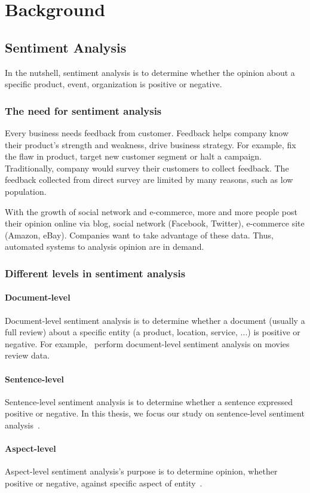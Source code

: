 \hypertarget{chap:background}{\chapter{Background}}\label{chap:background}
\section{Sentiment Analysis}
In the nutshell, sentiment analysis is to determine whether the opinion about a specific product, event, organization is positive or negative.
\subsection{The need for sentiment analysis}
Every business needs feedback from customer. Feedback helps company know their product's strength and weakness, drive business strategy.
For example, fix the flaw in product, target new customer segment or halt a campaign. 
Traditionally, company would survey their customers to collect feedback.  
The feedback collected from direct survey are limited by many reasons, such as low population.

With the growth of social network and e-commerce, more and more people post their opinion online via blog, social network (Facebook, Twitter), e-commerce site (Amazon, eBay). Companies want to take advantage of these data. Thus, automated systems to analysis opinion are in demand.
\subsection{Different levels in sentiment analysis}
\subsubsection{Document-level}
Document-level sentiment analysis is to determine whether a document (usually a full review) about a specific entity (a product, location, service, ...) is positive or negative. For example,~\cite{pang2002thumbs} perform document-level sentiment analysis on movies review data.
\subsubsection{Sentence-level}\label{sec:sent-level}
Sentence-level sentiment analysis is to determine whether a sentence expressed positive or negative. 
In this thesis, we focus our study on sentence-level sentiment analysis~\cite{liu2012sentiment}.
\subsubsection{Aspect-level}
Aspect-level  sentiment analysis's purpose is to determine opinion, whether positive or negative, against specific aspect of entity~\cite{liu2012sentiment}.

